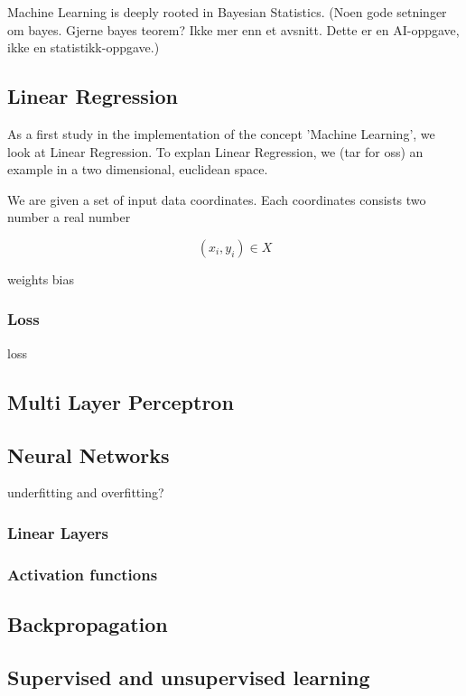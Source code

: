 Machine Learning is deeply rooted in Bayesian Statistics. (Noen gode setninger om bayes. Gjerne bayes teorem? Ikke mer enn et avsnitt. Dette er en AI-oppgave, ikke en statistikk-oppgave.)


\subsection{Linear Regression}

As a first study in the implementation of the concept 'Machine Learning', we look at Linear Regression.
To explan Linear Regression, we (tar for oss) an example in a two dimensional, euclidean space.

We are given a set of input data coordinates. 
Each coordinates consists two number a real number

$$  (x_i, y_i) \in X $$


weights
bias
\subsubsection{Loss}
loss



\subsection{Multi Layer Perceptron}
\subsection{Neural Networks}
underfitting and overfitting?
\subsubsection{Linear Layers}
\subsubsection{Activation functions}
\subsection{Backpropagation}
\subsection{Supervised and unsupervised learning}














